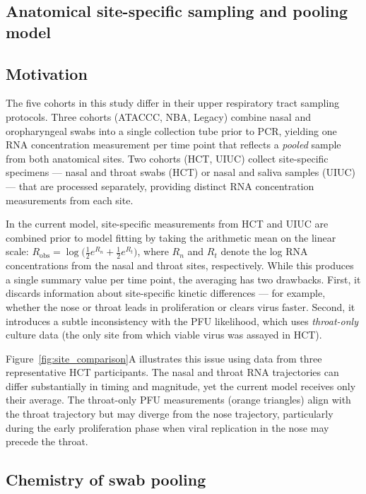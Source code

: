 \begin{appendix}
    \section{Anatomical site-specific sampling and pooling model}
    \label{sec:supp_site}

    \subsection{Motivation}

    The five cohorts in this study differ in their upper respiratory tract sampling protocols. Three cohorts (ATACCC, NBA, Legacy) combine nasal and oropharyngeal swabs into a single collection tube prior to PCR, yielding one RNA concentration measurement per time point that reflects a \emph{pooled} sample from both anatomical sites. Two cohorts (HCT, UIUC) collect site-specific specimens --- nasal and throat swabs (HCT) or nasal and saliva samples (UIUC) --- that are processed separately, providing distinct RNA concentration measurements from each site.

    In the current model, site-specific measurements from HCT and UIUC are combined prior to model fitting by taking the arithmetic mean on the linear scale: $R_{\text{obs}} = \log\bigl(\tfrac{1}{2}e^{R_n} + \tfrac{1}{2}e^{R_t}\bigr)$, where $R_n$ and $R_t$ denote the log RNA concentrations from the nasal and throat sites, respectively. While this produces a single summary value per time point, the averaging has two drawbacks. First, it discards information about site-specific kinetic differences --- for example, whether the nose or throat leads in proliferation or clears virus faster. Second, it introduces a subtle inconsistency with the PFU likelihood, which uses \emph{throat-only} culture data (the only site from which viable virus was assayed in HCT).

    Figure~\ref{fig:site_comparison}A illustrates this issue using data from three representative HCT participants. The nasal and throat RNA trajectories can differ substantially in timing and magnitude, yet the current model receives only their average. The throat-only PFU measurements (orange triangles) align with the throat trajectory but may diverge from the nose trajectory, particularly during the early proliferation phase when viral replication in the nose may precede the throat.

    \subsection{Chemistry of swab pooling}


\end{appendix}
